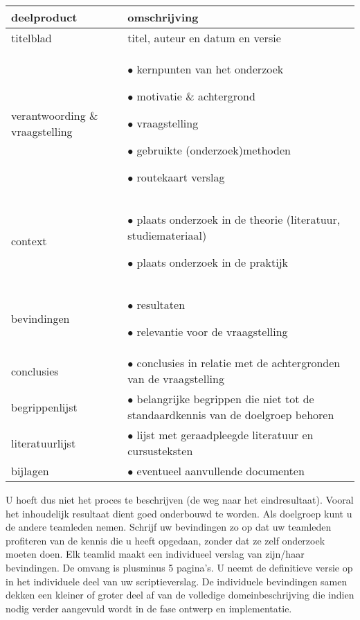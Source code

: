 \begin{center}
\begin{tabular}{|p{7em}|p{23em}|}
\hline
{\bf deelproduct} & {\bf omschrijving}
\\\hline
titelblad & titel, auteur en datum en versie
\\\hline
verantwoording \& vraagstelling &
    \par $\bullet$ kernpunten van het onderzoek
    \par $\bullet$ motivatie \& achtergrond
    \par $\bullet$ vraagstelling
    \par $\bullet$ gebruikte (onderzoek)methoden
    \par $\bullet$ routekaart verslag
\\\hline
context &
    \par $\bullet$ plaats onderzoek in de theorie (literatuur, studiemateriaal)
    \par $\bullet$ plaats onderzoek in de praktijk
\\\hline
bevindingen &
    \par $\bullet$ resultaten
    \par $\bullet$ relevantie voor de vraagstelling
\\\hline
conclusies &
    \par $\bullet$ conclusies in relatie met de achtergronden van de vraagstelling
\\\hline
begrippenlijst &
    \par $\bullet$ belangrijke begrippen die niet tot de standaardkennis van de doelgroep
behoren
\\\hline
literatuurlijst &
    \par $\bullet$ lijst met geraadpleegde literatuur en cursusteksten
\\\hline
bijlagen &
    \par $\bullet$ eventueel aanvullende documenten
\\\hline
\end{tabular}
\end{center}

U hoeft dus niet het proces te beschrijven (de weg naar het eindresultaat).
Vooral het inhoudelijk resultaat dient goed onderbouwd te worden.
Als doelgroep kunt u de andere teamleden nemen. Schrijf uw bevindingen zo op dat
uw teamleden profiteren van de kennis die u heeft opgedaan, zonder dat ze zelf
onderzoek moeten doen.
Elk teamlid maakt een individueel verslag van zijn/haar bevindingen. De omvang
is plusminus  5 pagina's. U neemt de definitieve versie op in het individuele
deel van uw scriptieverslag. De individuele bevindingen samen dekken een kleiner
of groter deel af van de volledige domeinbeschrijving die indien nodig verder
aangevuld wordt in de fase ontwerp en implementatie.

